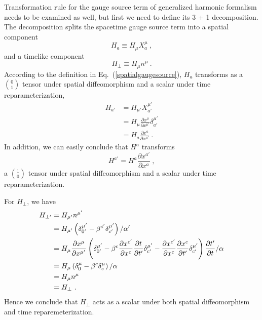Transformation rule for the gauge source term of generalized harmonic formalism needs to be examined as well, but first we need to define its 3 + 1 decomposition. The decomposition splits the spacetime gauge source term into a spatial component
\begin{equation}\label{spatialgaugesource}
	H_{a} \equiv H_{\mu}X^{\mu}_{a} \ ,
\end{equation}
and a timelike component
\begin{equation}
	H_{\perp} \equiv H_{\mu}n^{\mu} \ .
\end{equation}
According to the definition in Eq.~(\ref{spatialgaugesource}), $H_{a}$ transforms as a $0 \choose 1$ tensor under spatial diffeomorphism and a scalar under time reparameterization, 
\begin{align}
H_{a'} & = H_{\mu'}X^{\mu'}_{a'}\\
& = H_{\mu}\frac{\partial x^{\mu}}{\partial x^{\mu'}}\delta^{\mu'}_{a'}\\
& = H_{a}\frac{\partial x^{a}}{\partial x^{a'}} \ .
\end{align}
In addition, we can easily conclude that $H^{a}$ transforms 
\begin{equation}
H^{a'} = H^{a}\frac{\partial x^{a'}}{\partial x^{a}} \ ,
\end{equation}
a $1 \choose 0$ tensor under spatial diffeomorphism and a scalar under time reparameterization. 

For $H_{\perp}$, we have
\begin{align}
H_{\perp'} & = H_{\mu'}n^{\mu'} \notag\\
& = H_{\mu'}\left(\delta^{\mu'}_{0'} - \beta^{c'}\delta_{c'}^{\mu'}\right)/\alpha'\notag\\
& = H_{\mu}\frac{\partial x^{\mu}}{\partial x^{\mu'}}\left(\delta^{\mu'}_{0'} - \beta^{c}\frac{\partial x^{c'}}{\partial x^{c}}\frac{\partial t}{\partial t'}\delta^{\mu'}_{c'} - \frac{\partial x^{c'}}{\partial x^{c}}\frac{\partial x^{c}}{\partial t'}\delta^{\mu'}_{c'}\right)\frac{\partial t'}{\partial t} / \alpha \notag\\
& = H_{\mu}\left(\delta^{\mu}_{0} - \beta^{c}\delta_{c}^{\mu}\right)/\alpha \notag\\
& = H_{\mu}n^{\mu} \notag\\
& = H_{\perp} \ .
\end{align}
Hence we conclude that $H_{\perp}$ acts as a scalar under both spatial diffeomorphism and time reparemeterization. 

